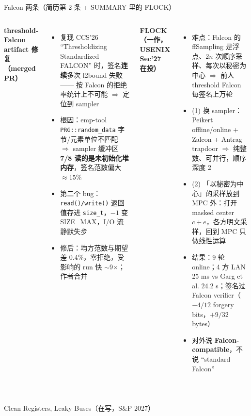 \documentclass[aspectratio=169,10pt,fontset=none]{ctexbeamer}
\begin{document}
\begin{frame}{Falcon 两条（简历第 2 条 + SUMMARY 里的 FLOCK）}
\begin{columns}[T]
\textbf{threshold-Falcon artifact 修复（merged PR）}
\begin{itemize}
  \item 复现 CCS'26 ``Thresholdizing Standardized FALCON'' 时，签名\textbf{连续}多次 l2bound 失败 —— 按 Falcon 的拒绝率统计上不可能 $\Rightarrow$ 定位到 sampler
  \item 根因：emp-tool \texttt{PRG::random\_data} 字节/元素单位不匹配 $\Rightarrow$ sampler 缓冲区 \textbf{7/8 读的是未初始化堆内存}，签名范数偏大 $\approx$15\%
  \item 第二个 bug：\texttt{read()/write()} 返回值存进 \texttt{size\_t}，$-1$ 变 SIZE\_MAX，I/O 流静默失步
  \item 修后：均方范数与期望差 0.4\%，零拒绝，受影响的 run 快 $\sim$9$\times$；作者合并
\end{itemize}
\textbf{FLOCK（一作，USENIX Sec'27 在投）}
\begin{itemize}
  \item 难点：Falcon 的 ffSampling 是浮点、$2n$ 次顺序采样、每次以秘密为中心 $\Rightarrow$ 前人 threshold Falcon 每签名上万轮
  \item (1) 换 sampler：Peikert offline/online + Zalcon + Antrag trapdoor $\Rightarrow$ 纯整数、可并行，顺序深度 2
  \item (2) 「以秘密为中心」的采样放到 MPC 外：打开 masked center $c+e$，各方明文采样，回到 MPC 只做线性运算
  \item 结果：9 轮 online；4 方 LAN 25 ms vs Garg et al. 24.2 s；签名过 Falcon verifier（$-4/12$ forgery bits，$+9/32$ bytes）
  \item 对外说 \textbf{Falcon-compatible}，不说 ``standard Falcon''
\end{itemize}
\end{columns}
\end{frame}
\begin{frame}
\vfill{}\\[6pt]{\normalsize Clean Registers, Leaky Buses（在写，S\&P 2027）}\vfill
\end{frame}
\end{document}
